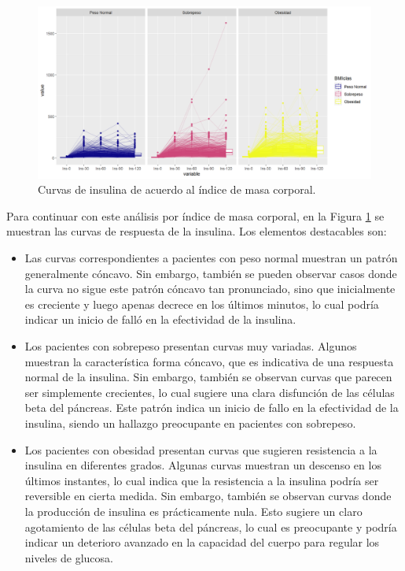 \begin{figure}[H]
    \centering
    \includegraphics[width = 0.9 \textwidth]{Imagenes/insCurvasBMI.png}
    \caption{Curvas de insulina de acuerdo al índice de masa corporal.}
    \label{fig:CurvasInsIBM}
\end{figure}

Para continuar con este análisis por índice de masa corporal, en la Figura \ref{fig:CurvasInsIBM} se muestran las curvas de respuesta de la insulina. Los elementos destacables son:

\begin{itemize}
    \item  Las curvas correspondientes a pacientes con peso normal muestran un patrón generalmente cóncavo. Sin embargo, también se pueden observar casos donde la curva no sigue este patrón cóncavo tan pronunciado, sino que inicialmente es creciente y luego apenas decrece en los últimos minutos, lo cual podría indicar un inicio de falló en la efectividad de la insulina.

    \item Los pacientes con sobrepeso presentan curvas muy variadas. Algunos muestran la característica forma cóncavo, que es indicativa de una respuesta normal de la insulina. Sin embargo, también se observan curvas que parecen ser simplemente crecientes, lo cual sugiere una clara disfunción de las células beta del páncreas. Este patrón indica un inicio de fallo en la efectividad de la insulina, siendo un hallazgo preocupante en pacientes con sobrepeso.

    \item Los pacientes con obesidad presentan curvas que sugieren resistencia a la insulina en diferentes grados. Algunas curvas muestran un descenso en los últimos instantes, lo cual indica que la resistencia a la insulina podría ser reversible en cierta medida. Sin embargo, también se observan curvas donde la producción de insulina es prácticamente nula. Esto sugiere un claro agotamiento de las células beta del páncreas, lo cual es preocupante y podría indicar un deterioro avanzado en la capacidad del cuerpo para regular los niveles de glucosa.
    \end{itemize}

